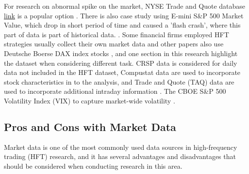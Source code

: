 \documentclass{article}
\begin{document}
For research on abnormal spike on the market, NYSE Trade and Quote database \href{https://www.nyse.com/market-data/historical/daily-taq}{link} is a popular option 
\cite{campbell1997econometric}.  There is also case study using E-mini S\&P 500 Market Value, which drop in short 
period of time and caused a 'flash crash', where this part of data is part of historical data. \cite{kirilenko2011microstructure}.
Some financial firms employed HFT strategies usually collect their own market data and 
other papers also use Deutsche Boerse DAX index stocks \cite{brogaard2014high}, and one section in this research 
highlight the dataset when considering different task. CRSP data is considered for daily data not included in the HFT dataset, 
Compustat data are used to incorporate stock characteristics in to the analysis, and Trade and Quote (TAQ) data are used to incorporate additional intraday information
\cite{brogaard2014high}. The CBOE S\&P 500 Volatility Index (VIX) to capture market-wide volatility \cite{brogaard2014high}.


\subsection{Pros and Cons with Market Data}
Market data is one of the most commonly used data sources in high-frequency trading (HFT) research, and it has several advantages and disadvantages that should be considered when conducting research in this area.
\end{document}
